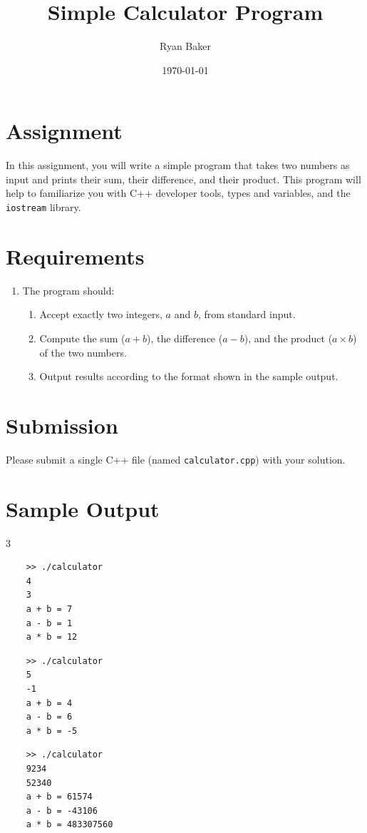 \documentclass{article}
\title{Simple Calculator Program}
\author{Ryan Baker}
\date{\today}
\begin{document}
\maketitle

\section*{Assignment}

\noindent
In this assignment, you will write a simple program that takes two numbers as input and prints their sum, their difference, and their product. This program will help to familiarize you with C++ developer tools, types and variables, and the \texttt{iostream} library.

\section*{Requirements}

\begin{enumerate}
	\item The program should:
	\begin{enumerate}
		\item Accept exactly two integers, $a$ and $b$, from standard input.
		\item Compute the sum ($a+b$), the difference ($a-b$), and the product ($a\times b$) of the two numbers.
		\item Output results according to the format shown in the sample output.
	\end{enumerate}
\end{enumerate}

\section*{Submission}

\noindent
Please submit a single C++ file (named \texttt{calculator.cpp}) with your solution.

\section*{Sample Output}

\begin{center}
	
\begin{multicols}{3}
\begin{verbatim}
	>> ./calculator
	4
	3
	a + b = 7
	a - b = 1
	a * b = 12
\end{verbatim}
\columnbreak
\begin{verbatim}
	>> ./calculator
	5
	-1
	a + b = 4
	a - b = 6
	a * b = -5
\end{verbatim}
\columnbreak
\begin{verbatim}
	>> ./calculator
	9234
	52340
	a + b = 61574
	a - b = -43106
	a * b = 483307560
\end{verbatim}
\end{multicols}
\end{center}
\end{document}
